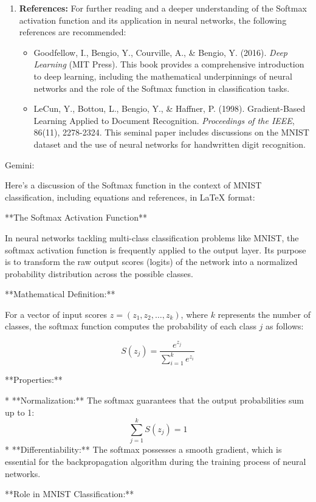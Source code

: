 \begin{enumerate}
    \item \textbf{References:}
    For further reading and a deeper understanding of the Softmax activation function and its application in neural networks, the following references are recommended:
    \begin{itemize}
        \item Goodfellow, I., Bengio, Y., Courville, A., \& Bengio, Y. (2016). \textit{Deep Learning} (MIT Press). This book provides a comprehensive introduction to deep learning, including the mathematical underpinnings of neural networks and the role of the Softmax function in classification tasks.
        \item LeCun, Y., Bottou, L., Bengio, Y., \& Haffner, P. (1998). Gradient-Based Learning Applied to Document Recognition. \textit{Proceedings of the IEEE}, 86(11), 2278-2324. This seminal paper includes discussions on the MNIST dataset and the use of neural networks for handwritten digit recognition.
    \end{itemize}
\end{enumerate}

Gemini:

Here's a discussion of the Softmax function in the context of MNIST classification, including equations and references, in LaTeX format:

**The Softmax Activation Function**

In neural networks tackling multi-class classification problems like MNIST, the softmax activation function is frequently applied to the output layer.  Its purpose is to transform the raw output scores (logits) of the network into a normalized probability distribution across the possible classes. 

**Mathematical Definition:**

For a vector of input scores $z = (z_1, z_2, \dots, z_k)$, where $k$ represents the number of classes, the softmax function computes the probability of each class $j$ as follows:

$$
S(z_j) = \frac{e^{z_j}}{\sum_{i=1}^{k} e^{z_i}} 
$$

**Properties:**

* **Normalization:** The softmax guarantees that the output probabilities sum up to 1:
  $$
  \sum_{j=1}^{k} S(z_j) = 1
  $$
* **Differentiability:**  The softmax possesses a smooth gradient, which is essential for the backpropagation algorithm during the training process of neural networks.

**Role in MNIST Classification:**

